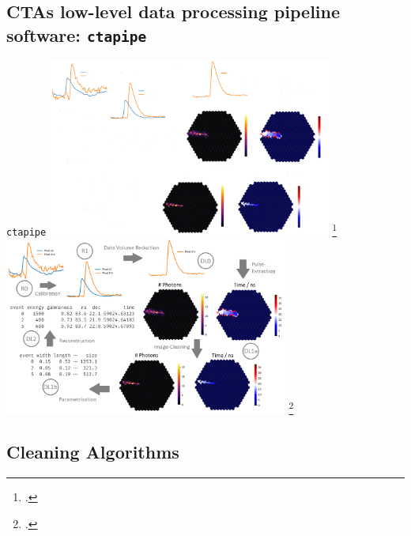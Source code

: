 \subsection{CTAs low-level data processing pipeline software: \texttt{ctapipe}}
\begin{frame}{\texttt{ctapipe}}
  \centering
  \ifdefined\darktheme
    \includegraphics[width=0.7\textwidth]{graphics/ctapipe_darktheme.png}
    \footcite[\textcolor{white!85!black}{Adapted from}][]{hackfeld}
  \else
    \includegraphics[width=0.7\textwidth]{graphics/ctapipe.png}
    \footcite[\textcolor{darkgray!85!black}{Image Credit:}][]{hackfeld}
  \fi
\end{frame}

\subsection{Cleaning Algorithms}
\ifdefined\darktheme
  
\else
  
\fi
